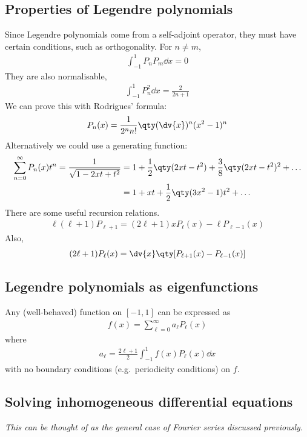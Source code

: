 \subsection{Properties of Legendre polynomials}
Since Legendre polynomials come from a self-adjoint operator, they must have certain conditions, such as orthogonality.
For $n \neq m$,
\begin{align*}
    \int_{-1}^1 P_n P_m \dd{x} = 0
\end{align*}
They are also normalisable,
\begin{align*}
    \int_{-1}^1 P_n^2 \dd{x} = \frac{2}{2n+1}
\end{align*}
We can prove this with Rodrigues' formula:
\begin{align*}
    P_n(x) = \frac{1}{2^n n!} \qty( \dv{x} )^n (x^2 - 1)^n
\end{align*}
Alternatively we could use a generating function:
\begin{align*}
    \sum_{n=0}^\infty P_n(x) t^n = \frac{1}{\sqrt{1 - 2xt + t^2}} & = 1 + \frac{1}{2}\qty(2xt - t^2) + \frac{3}{8}\qty(2xt - t^2)^2 + \dots \\
                                                                & = 1 + xt + \frac{1}{2}\qty(3x^2 - 1)t^2 + \dots
\end{align*}
There are some useful recursion relations.
\begin{align*}
    \ell(\ell + 1) P_{\ell + 1} = (2 \ell + 1) x P_\ell(x) - \ell P_{\ell - 1}(x)
\end{align*}
Also,
\begin{align*}
    (2\ell + 1)P_\ell(x) = \dv{x} \qty[ P_{\ell + 1}(x) - P_{\ell - 1}(x) ]
\end{align*}

\subsection{Legendre polynomials as eigenfunctions}
Any (well-behaved) function on $[-1,1]$ can be expressed as
\begin{align*}
    f(x) = \sum_{\ell = 0}^\infty a_\ell P_\ell(x)
\end{align*}
where
\begin{align*}
    a_\ell = \frac{2\ell + 1}{2} \int_{-1}^1 f(x) P_\ell(x) \dd{x}
\end{align*}
with no boundary conditions (e.g.\ periodicity conditions) on $f$.

\subsection{Solving inhomogeneous differential equations}
\textit{This can be thought of as the general case of Fourier series discussed previously.}

